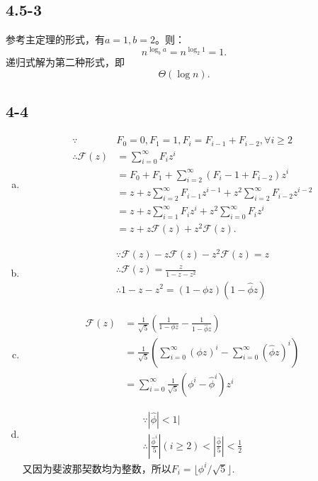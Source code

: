 \documentclass[twocolumn]{article}
\begin{document}
	\subsection*{4.5-3}
	参考主定理的形式，有$a=1,b=2$。则：$$n^{\log_b a}=n^{\log_2 1}=1.$$递归式解为第二种形式，即$$\Theta (\log n).$$
	\subsection*{4-4}
	\begin{enumerate}[a.]
		\item 
		\[
		\begin{aligned}
				\because &F_0=0,F_1=1,F_i=F_{i-1}+F_{i-2},\forall i\ge 2\\
				\therefore\mathcal{F}(z)&=\sum_{i=0}^{\infty}F_i{z}^i\\
				&=F_0+F_1+\sum_{i=2}^{\infty}(F_i-1+F_{i-2}){z}^i\\
				&={z}+{z}\sum_{i=2}^{\infty}F_{i-1}{z}^{i-1}+{z}^2\sum_{i=2}^{\infty}F_{i-2}{z}^{i-2}\\
				&={z}+{z}\sum_{i=1}^{\infty}F_i{z}^i+{z}^2\sum_{i=0}^{\infty}F_i{z}^i\\
				&={z}+{z\mathcal{F}(z)}+{z}^2{\mathcal{F}(z)}.
		\end{aligned}
		\]
		\item
		\[
			\begin{aligned}
			\because \mathcal{F}(z)-z\mathcal{F}(z)-z^2\mathcal{F}(z)=z\\
			\therefore \mathcal{F}(z)=\frac{z}{1-z-z^2}\\
			\therefore 1-z-z^2=(1-\phi z)(1-\hat{\phi}z)
			\end{aligned}
		\]
		\item 
		\[
		\begin{aligned}
			\mathcal{F}(z)&=\frac{1}{\sqrt{5}}\left(\frac{1}{1-\phi z}-\frac{1}{1-\hat{\phi}z}\right)\\
			&=\frac{1}{\sqrt{5}}\left(\sum_{i=0}^{\infty}(\phi z)^i-\sum_{i=0}^{\infty}(\hat{\phi}z)^i\right)\\
			&=\sum_{i=0}^{\infty}\frac{1}{\sqrt{5}}\left(\phi^i-\hat{\phi}^i\right)z^i
		\end{aligned}
		\]
		\item 
		\[
			\begin{aligned}
			\because\left|\hat{\phi}\right|<1|\\
			\therefore\left|\frac{\hat{\phi}^i}{5}\right|(i\ge 2)< \left|\frac{\hat{\phi}}{5}\right|<\frac{1}{2}
			\end{aligned}	
		\]
		又因为斐波那契数均为整数，所以$F_i=\lfloor\phi^i/\sqrt{5}\rfloor.$
	\end{enumerate}
\end{document}
